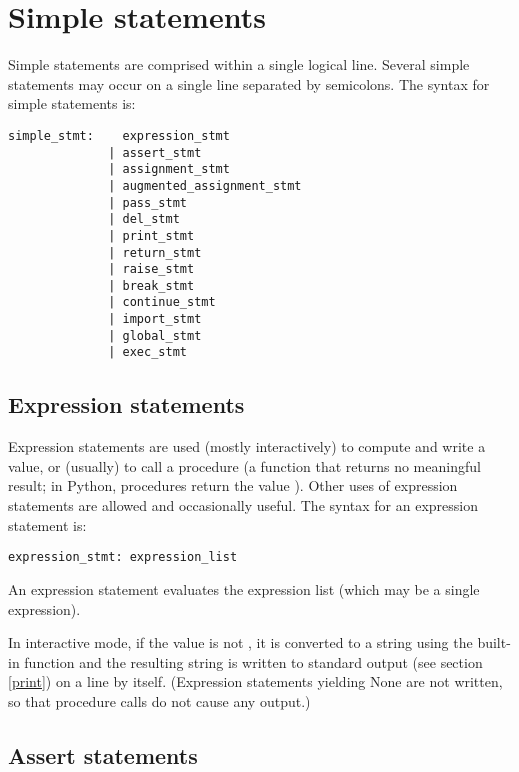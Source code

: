 \chapter{Simple statements \label{simple}}

Simple statements are comprised within a single logical line.
Several simple statements may occur on a single line separated
by semicolons.  The syntax for simple statements is:

\begin{verbatim}
simple_stmt:    expression_stmt
              | assert_stmt
              | assignment_stmt
              | augmented_assignment_stmt
              | pass_stmt
              | del_stmt
              | print_stmt
              | return_stmt
              | raise_stmt
              | break_stmt
              | continue_stmt
              | import_stmt
              | global_stmt
              | exec_stmt
\end{verbatim}

\section{Expression statements \label{exprstmts}}

Expression statements are used (mostly interactively) to compute and
write a value, or (usually) to call a procedure (a function that
returns no meaningful result; in Python, procedures return the value
).  Other uses of expression statements are allowed and
occasionally useful.  The syntax for an expression statement is:

\begin{verbatim}
expression_stmt: expression_list
\end{verbatim}

An expression statement evaluates the expression list (which may be a
single expression).

In interactive mode, if the value is not , it is converted
to a string using the built-in 
function and the resulting string is written to standard output (see
section \ref{print}) on a line by itself.  (Expression statements
yielding None are not written, so that procedure calls do not cause
any output.)

\section{Assert statements \label{assert}}

